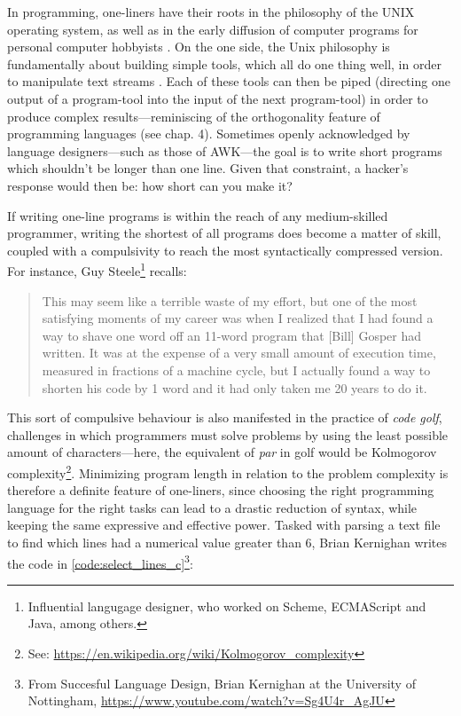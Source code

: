 In programming, one-liners have their roots in the philosophy of the UNIX operating system, as well as in the early diffusion of computer programs for personal computer hobbyists \citep{montfort_10_2014}. On the one side, the Unix philosophy is fundamentally about building simple tools, which all do one thing well, in order to manipulate text streams \citep{raymond_art_2003}. Each of these tools can then be piped (directing one output of a program-tool into the input of the next program-tool) in order to produce complex results—reminiscing of the orthogonality feature of programming languages (see chap. 4). Sometimes openly acknowledged by language designers—such as those of AWK—the goal is to write short programs which shouldn't be longer than one line. Given that constraint, a hacker's response would then be: how short can you make it?

If writing one-line programs is within the reach of any medium-skilled programmer, writing the shortest of all programs does become a matter of skill, coupled with a compulsivity to reach the most syntactically compressed version. For instance, Guy Steele\footnote{Influential langugage designer, who worked on Scheme, ECMAScript and Java, among others.} recalls:

\begin{quote}
  This may seem like a terrible waste of my effort, but one of the most satisfying moments of my career was when I realized that I had found a way to shave one word off an 11-word program that [Bill] Gosper had written. It was at the expense of a very small amount of execution time, measured in fractions of a machine cycle, but I actually found a way to shorten his code by 1 word and it had only taken me 20 years to do it. \citep{seibel_coders_2009}
\end{quote}

This sort of compulsive behaviour is also manifested in the practice of \emph{code golf}, challenges in which programmers must solve problems by using the least possible amount of characters—here, the equivalent of \emph{par} in golf would be Kolmogorov complexity\footnote{See: \url{https://en.wikipedia.org/wiki/Kolmogorov_complexity}}. Minimizing program length in relation to the problem complexity is therefore a definite feature of one-liners, since choosing the right programming language for the right tasks can lead to a drastic reduction of syntax, while keeping the same expressive and effective power. Tasked with parsing a text file to find which lines had a numerical value greater than 6, Brian Kernighan writes the code in \ref{code:select_lines_c}\footnote{From Succesful Language Design, Brian Kernighan at the University of Nottingham, \url{https://www.youtube.com/watch?v=Sg4U4r_AgJU}}:

